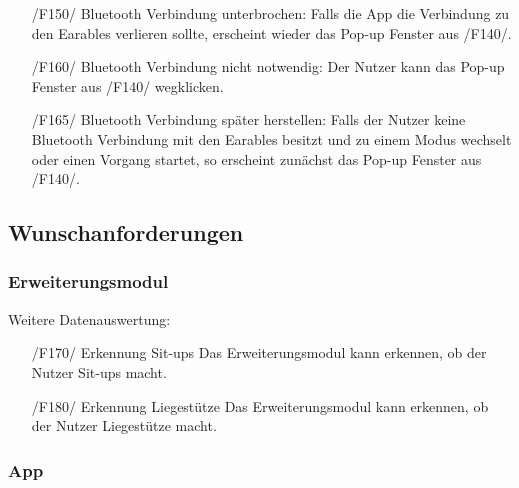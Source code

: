 \documentclass[a4paper,12pt]{article}
\begin{document}
\begin{itemize}
      \item[/F150/] \textsf{Bluetooth Verbindung unterbrochen:} Falls die App die Verbindung zu den \gls{Earables} verlieren sollte, erscheint wieder das Pop-up Fenster aus /F140/.
      \item[/F160/] \textsf{Bluetooth Verbindung nicht notwendig:} Der Nutzer kann das Pop-up Fenster aus /F140/ wegklicken.
      \item[/F165/] \textsf{Bluetooth Verbindung später herstellen:} Falls der Nutzer keine Bluetooth Verbindung mit den \gls{Earables} besitzt und zu einem Modus wechselt oder einen Vorgang startet, so erscheint zunächst das Pop-up Fenster aus /F140/.
    \end{itemize}
  \subsection{Wunschanforderungen}
    \subsubsection{Erweiterungsmodul}
      Weitere Datenauswertung:
      \begin{itemize}
      \item[/F170/] \textsf{Erkennung Sit-ups} Das Erweiterungsmodul kann erkennen, ob der Nutzer Sit-ups macht.
      \item[/F180/] \textsf{Erkennung Liegestütze} Das Erweiterungsmodul kann erkennen, ob der Nutzer Liegestütze macht.
      \end{itemize} 
    \subsubsection{App}
    
\end{document}
